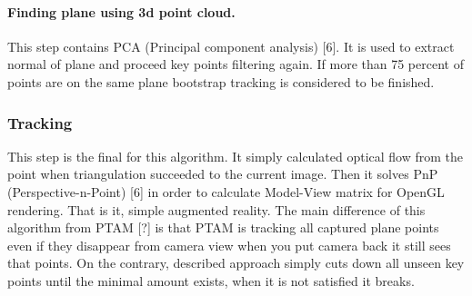\documentclass[../../main]{subfiles}
\begin{document}
\paragraph{Finding plane using 3d point cloud.}
This step contains PCA (Principal component analysis) [6]. It is used to extract normal of plane and proceed key points filtering again. If more than 75 percent of points are on the same plane bootstrap tracking is considered to be finished.

\subsubsection{Tracking}
This step is the final for this algorithm. It simply calculated optical flow from the point when triangulation succeeded to the current image. Then it solves PnP (Perspective-n-Point) [6] in order to calculate Model-View matrix for OpenGL rendering. That is it, simple augmented reality.
The main difference of this algorithm from PTAM [?] is that PTAM is tracking all captured plane points even if they disappear from camera view when you put camera back it still sees that points. On the contrary, described approach simply cuts down all unseen key points until the minimal amount exists, when it is not satisfied it breaks.
\end{document}
